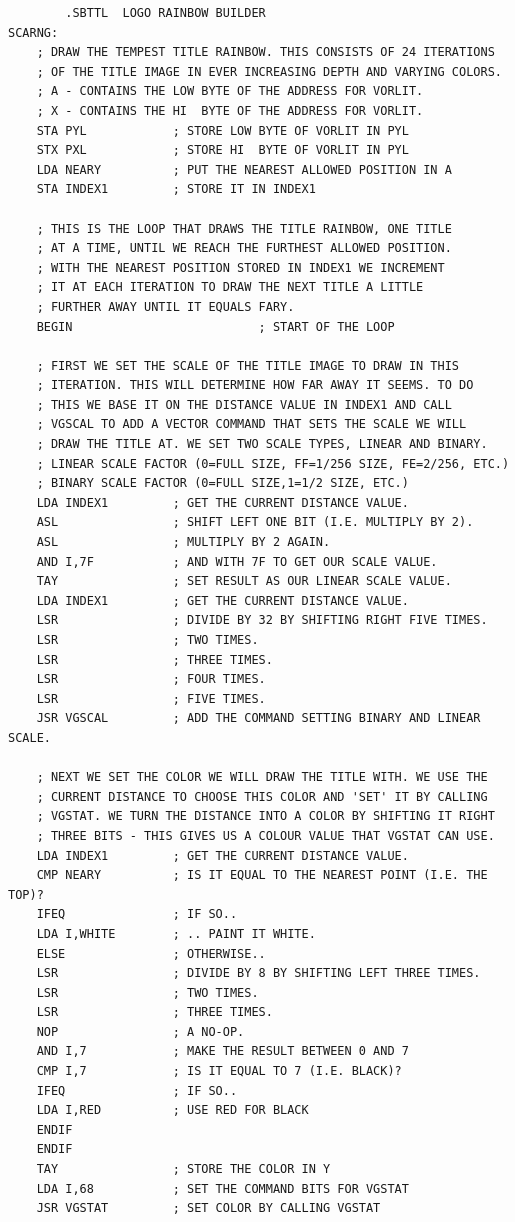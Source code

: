 \begin{lstlisting}
        .SBTTL  LOGO RAINBOW BUILDER
SCARNG:
    ; DRAW THE TEMPEST TITLE RAINBOW. THIS CONSISTS OF 24 ITERATIONS
    ; OF THE TITLE IMAGE IN EVER INCREASING DEPTH AND VARYING COLORS.
    ; A - CONTAINS THE LOW BYTE OF THE ADDRESS FOR VORLIT.
    ; X - CONTAINS THE HI  BYTE OF THE ADDRESS FOR VORLIT.
    STA PYL            ; STORE LOW BYTE OF VORLIT IN PYL
    STX PXL            ; STORE HI  BYTE OF VORLIT IN PYL
    LDA NEARY          ; PUT THE NEAREST ALLOWED POSITION IN A
    STA INDEX1         ; STORE IT IN INDEX1
    
    ; THIS IS THE LOOP THAT DRAWS THE TITLE RAINBOW, ONE TITLE
    ; AT A TIME, UNTIL WE REACH THE FURTHEST ALLOWED POSITION.
    ; WITH THE NEAREST POSITION STORED IN INDEX1 WE INCREMENT
    ; IT AT EACH ITERATION TO DRAW THE NEXT TITLE A LITTLE
    ; FURTHER AWAY UNTIL IT EQUALS FARY.
    BEGIN                          ; START OF THE LOOP
    
    ; FIRST WE SET THE SCALE OF THE TITLE IMAGE TO DRAW IN THIS
    ; ITERATION. THIS WILL DETERMINE HOW FAR AWAY IT SEEMS. TO DO
    ; THIS WE BASE IT ON THE DISTANCE VALUE IN INDEX1 AND CALL
    ; VGSCAL TO ADD A VECTOR COMMAND THAT SETS THE SCALE WE WILL
    ; DRAW THE TITLE AT. WE SET TWO SCALE TYPES, LINEAR AND BINARY.
    ; LINEAR SCALE FACTOR (0=FULL SIZE, FF=1/256 SIZE, FE=2/256, ETC.)
    ; BINARY SCALE FACTOR (0=FULL SIZE,1=1/2 SIZE, ETC.)
    LDA INDEX1         ; GET THE CURRENT DISTANCE VALUE.
    ASL                ; SHIFT LEFT ONE BIT (I.E. MULTIPLY BY 2).
    ASL                ; MULTIPLY BY 2 AGAIN.
    AND I,7F           ; AND WITH 7F TO GET OUR SCALE VALUE.
    TAY                ; SET RESULT AS OUR LINEAR SCALE VALUE.
    LDA INDEX1         ; GET THE CURRENT DISTANCE VALUE.
    LSR                ; DIVIDE BY 32 BY SHIFTING RIGHT FIVE TIMES.
    LSR                ; TWO TIMES.
    LSR                ; THREE TIMES.
    LSR                ; FOUR TIMES.
    LSR                ; FIVE TIMES.
    JSR VGSCAL         ; ADD THE COMMAND SETTING BINARY AND LINEAR SCALE.
    
    ; NEXT WE SET THE COLOR WE WILL DRAW THE TITLE WITH. WE USE THE
    ; CURRENT DISTANCE TO CHOOSE THIS COLOR AND 'SET' IT BY CALLING
    ; VGSTAT. WE TURN THE DISTANCE INTO A COLOR BY SHIFTING IT RIGHT
    ; THREE BITS - THIS GIVES US A COLOUR VALUE THAT VGSTAT CAN USE.
    LDA INDEX1         ; GET THE CURRENT DISTANCE VALUE.
    CMP NEARY          ; IS IT EQUAL TO THE NEAREST POINT (I.E. THE TOP)?
    IFEQ               ; IF SO..
    LDA I,WHITE        ; .. PAINT IT WHITE.
    ELSE               ; OTHERWISE..
    LSR                ; DIVIDE BY 8 BY SHIFTING LEFT THREE TIMES.
    LSR                ; TWO TIMES.
    LSR                ; THREE TIMES.
    NOP                ; A NO-OP.
    AND I,7            ; MAKE THE RESULT BETWEEN 0 AND 7
    CMP I,7            ; IS IT EQUAL TO 7 (I.E. BLACK)?
    IFEQ               ; IF SO..
    LDA I,RED          ; USE RED FOR BLACK
    ENDIF
    ENDIF
    TAY                ; STORE THE COLOR IN Y
    LDA I,68           ; SET THE COMMAND BITS FOR VGSTAT
    JSR VGSTAT         ; SET COLOR BY CALLING VGSTAT
    

\end{lstlisting}
